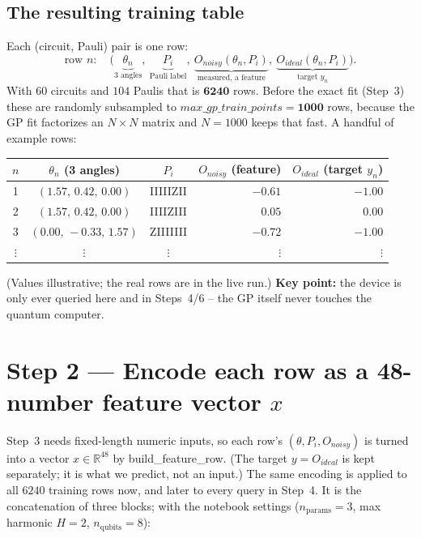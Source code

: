 \documentclass[11pt]{article}
\def\bm#1{#1}%
\def\texttt#1{#1}%
\def\mathrm#1{#1}%
\begin{document}
\subsection{The resulting training table}
Each (circuit, Pauli) pair is one row:
\begin{equation}
\text{row }n:\quad \big(\underbrace{\bm\theta_n}_{\text{3 angles}},\ \underbrace{P_i}_{\text{Pauli label}},\ \underbrace{O_{\mathrm{noisy}}(\bm\theta_n,P_i)}_{\text{measured, a feature}},\ \underbrace{O_{\mathrm{ideal}}(\bm\theta_n,P_i)}_{\text{target }y_n}\big).
\end{equation}
With $60$ circuits and $104$ Paulis that is $\mathbf{6240}$ rows. Before the exact
fit (Step~3) these are randomly subsampled to
$\texttt{max\_gp\_train\_points}=\mathbf{1000}$ rows, because the GP fit factorizes
an $N\times N$ matrix and $N=1000$ keeps that fast. A handful of example rows:
\begin{center}
\renewcommand{\arraystretch}{1.2}
\begin{tabular}{@{}cccrr@{}}
\toprule
$n$ & $\bm\theta_n$ (3 angles) & $P_i$ & $O_{\mathrm{noisy}}$ (feature) & $O_{\mathrm{ideal}}$ (target $y_n$) \\
\midrule
1 & $(1.57,\,0.42,\,0.00)$ & \texttt{IIIIIZII} & $-0.61$ & $-1.00$ \\
2 & $(1.57,\,0.42,\,0.00)$ & \texttt{IIIIZIII} & $\phantom{-}0.05$ & $\phantom{-}0.00$ \\
3 & $(0.00,\,-0.33,\,1.57)$ & \texttt{ZIIIIIII} & $-0.72$ & $-1.00$ \\
$\vdots$ & $\vdots$ & $\vdots$ & $\vdots$ & $\vdots$ \\
\bottomrule
\end{tabular}
\end{center}
(Values illustrative; the real rows are in the live run.) \textbf{Key point:} the
device is only ever queried here and in Steps~4/6 -- the GP itself never touches
the quantum computer.

\section{Step 2 --- Encode each row as a 48-number feature vector \texorpdfstring{$\bm x$}{x}}
\label{sec:feature}

Step~3 needs fixed-length numeric inputs, so each row's
$(\bm\theta,P_i,O_{\mathrm{noisy}})$ is turned into a vector $\bm x\in\mathbb R^{48}$
by \texttt{build\_feature\_row}. (The target $y=O_{\mathrm{ideal}}$ is kept
separately; it is what we predict, not an input.) The same encoding is applied to
all $6240$ training rows now, and later to every query in Step~4. It is the
concatenation of three blocks; with the notebook settings ($n_{\text{params}}=3$,
max harmonic $H=2$, $n_{\text{qubits}}=8$):
\end{document}
